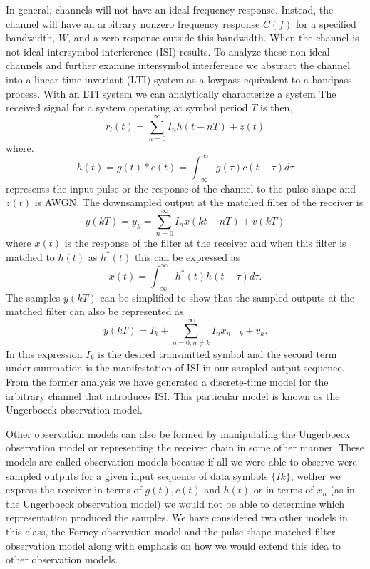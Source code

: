 In general, channels will not have an ideal frequency response. Instead, the channel will have an arbitrary nonzero frequency response $C(f)$ for a specified bandwidth, $W$, and a zero response outside this bandwidth. When the channel is not ideal intersymbol interference (ISI) results. To analyze these non ideal channels and further examine intersymbol interference we abstract the channel into a linear time-invariant (LTI) system as a lowpass equivalent to a bandpass process. With an LTI system we can analytically characterize a system
The received signal for a system operating at symbol period $T$ is then,
\[ r_l(t) = \sum_{n=0}^{\infty} I_n h(t -nT) + z(t) \]
where.
\[h(t) =  g(t) * c(t) = \int_{-\infty}^{\infty} g(\tau)c(t-\tau)d\tau \]
represents the input pulse or the response of the channel to the pulse shape and $z(t)$ is AWGN. The downsampled output at the matched filter of the receiver is
\[ y(kT) = y_k = \sum_{n=0}^{\infty} I_n x(kt-nT) + v(kT)\]
where $x(t)$ is the response of the filter at the receiver and when this filter is matched to $h(t)$ as $h^*(t)$ this can be expressed as
\[x(t) = \int_{-\infty}^{\infty} h^*(t)h(t-\tau) d\tau. \]
The samples $y(kT)$ can be simplified to show that the sampled outputs at the matched filter can also be represented as
\[ y(kT) = I_k + \sum_{n=0, n \neq k}^{\infty} I_n x_{n-k} + v_{k}. \]
In this expression $I_k$ is the desired transmitted symbol and the second term under summation is the manifestation of ISI in our sampled output sequence.
From the former analysis we have generated a discrete-time model for the arbitrary channel that introduces ISI. This particular model is known as the Ungerboeck observation model.

Other observation models can also be formed by manipulating the Ungerboeck observation model or representing the receiver chain in some other manner. These models are called observation models because if all we were able to observe were sampled outputs for a given input sequence of data symbols $\{Ik\}$, wether we express the receiver in terms of $g(t), c(t)$ and $h(t)$ or in terms of $x_n$ (as in the Ungerboeck observation model) we would not be able to determine which representation produced the samples. We have considered two other models in this class, the Forney observation model and the pulse shape matched filter observation model along with emphasis on how we would extend this idea to other observation models.

